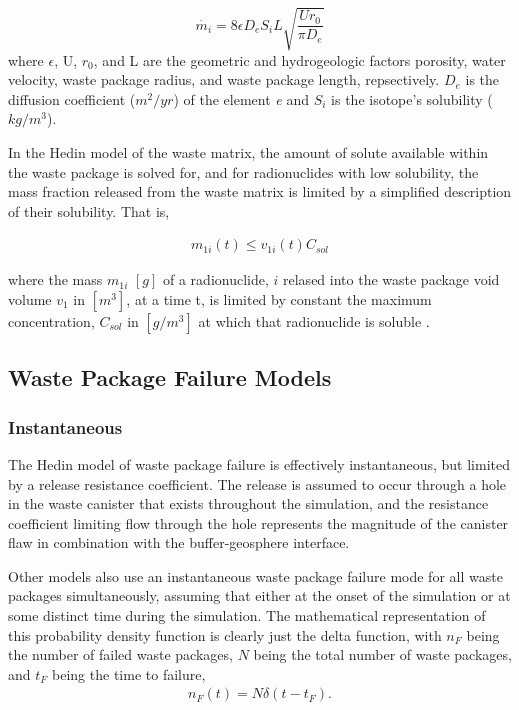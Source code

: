 \begin{equation} \dot{m_i}=8\epsilon D_eS_iL\sqrt{\frac{Ur_0}{\pi D_e}}
\end{equation} where $\epsilon$, U, $r_0$, and L are the geometric and
hydrogeologic factors porosity, water velocity, waste package radius, and waste
package length, repsectively. $D_e$ is the diffusion coefficient ($m^2/yr$) of
the element \emph{e} and $S_i$ is the isotope's solubility ($kg/m^3$).

In the Hedin model of the waste matrix, the amount of solute available within
the waste package is solved for, and for radionuclides with low solubility, the mass
fraction released from the waste matrix is limited by a simplified description
of their solubility. That is, 

\begin{align*} m_{1i}(t)\le v_{1i}(t)C_{sol} \end{align*}

where the mass $m_{1i}$ $[g]$ of a radionuclide, $i$ relased into the waste package
void volume $v_1$ in $[m^3]$, at a time t, is limited by constant the maximum
concentration, $C_{sol}$ in $[g/m^3]$ at which that radionuclide is soluble 
\cite{hedin_integrated_2002}.


\subsection{Waste Package Failure Models}




\subsubsection{Instantaneous}
 
The Hedin model of waste package failure is effectively instantaneous, but
limited by a release resistance coefficient. The release is assumed  to occur
through a hole in the waste canister that exists throughout the simulation, and
the resistance coefficient limiting flow through the hole represents the
magnitude of the canister flaw in combination with the buffer-geosphere
interface\cite{hedin_integrated_2002}.

Other models also use an instantaneous waste package failure mode for all waste  
packages simultaneously, assuming that either at the onset of the simulation
or at some distinct time during the simulation. The mathematical representation of this 
probability density function is clearly just the delta function, with $n_F$ 
being the number of failed waste packages, $N$ being the total number of waste 
packages, and $t_F$ being the time to failure,
\begin{align}
  n_F(t) = N\delta(t-t_F).
  \label{instantaneous}
\end{align}

